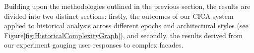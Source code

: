 %



Building upon the methodologies outlined in the previous section, the results are divided into two distinct sections: firstly, the outcomes of our CICA system applied to historical analysis across different epochs and architectural styles (see Figure\ref{fig:HistoricalComplexityGraph}), and secondly, the results derived from our experiment gauging user responses to complex facades.





